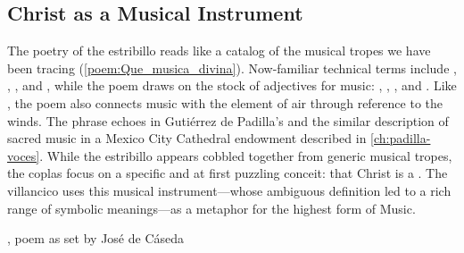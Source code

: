 \subsection{Christ as a Musical Instrument}

The poetry of the estribillo reads like a catalog of the musical tropes we have
been tracing (\cref{poem:Que_musica_divina}).
Now-familiar technical terms include , ,
, and , while the poem draws on the stock
of adjectives for music: , ,
, and .
Like , the poem also connects music with the element of
air through reference to the winds.
The phrase  echoes  in Gutiérrez de Padilla's  and the
similar description of sacred music in a Mexico City Cathedral endowment
described in \cref{ch:padilla-voces}.
While the estribillo appears cobbled together from generic musical tropes, the
coplas focus on a specific and at first puzzling conceit: that Christ is a
.
The villancico uses this musical instrument---whose ambiguous definition led to
a rich range of symbolic meanings---as a metaphor for the highest form of
Music.

{, poem as set by José de Cáseda}


